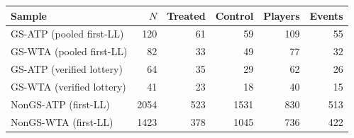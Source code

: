 \begin{tabular}{lrrrrr}
\toprule
Sample & $N$ & Treated & Control & Players & Events \\
\midrule
GS-ATP (pooled first-LL) & 120 & 61 & 59 & 109 & 55 \\
GS-WTA (pooled first-LL) & 82 & 33 & 49 & 77 & 32 \\
GS-ATP (verified lottery) & 64 & 35 & 29 & 62 & 26 \\
GS-WTA (verified lottery) & 41 & 23 & 18 & 40 & 15 \\
NonGS-ATP (first-LL) & 2054 & 523 & 1531 & 830 & 513 \\
NonGS-WTA (first-LL) & 1423 & 378 & 1045 & 736 & 422 \\
\bottomrule
\end{tabular}
